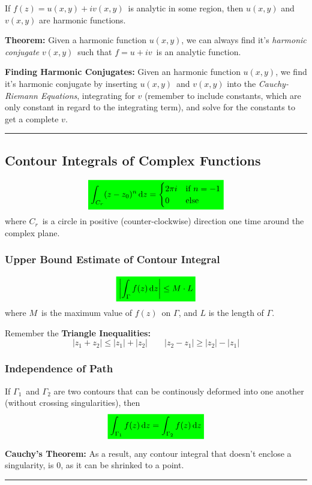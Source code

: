 \documentclass[10pt,a4paper]{article}
\newcommand{\holine}{\rule{286pt}{1pt}}
\newcommand{\gr}[1]{\colorbox{green}{$\displaystyle #1$}}
\begin{document}
\begin{multicols}{2}
If $f(z) = u(x,y) + iv(x,y)$ is analytic in some region, then $u(x,y)$ and $v(x,y)$ are harmonic functions.

\textbf{Theorem:} Given a harmonic function $u(x,y)$, we can always find it's \textit{harmonic conjugate} $v(x,y)$ such that $f = u + iv$ is an analytic function.


\textbf{Finding Harmonic Conjugates:} Given an harmonic function $u(x,y)$, we find it's harmonic conjugate by inserting $u(x,y)$ and $v(x,y)$ into the \textit{Cauchy-Riemann Equations}, integrating for $v$ (remember to include constants, which are only constant in regard to the integrating term), and solve for the constants to get a complete $v$.


\holine
\subsection*{Contour Integrals of Complex Functions}
\[\gr{
    \int_{C_r} (z-z_0)^n \dd{z} = \begin{cases}
    2\pi i &\text{if} \ n=-1 \\
    0 &\text{else}
    \end{cases}
}\]
where $C_r$ is a circle in positive (counter-clockwise) direction one time around the complex plane.

\subsubsection*{Upper Bound Estimate of Contour Integral}
\[\gr{
    \qty|\int_\Gamma f(z) \dd{z}| \leq M\cdot L
}\]
where $M$ is the maximum value of $f(z)$ on $\Gamma$, and $L$ is the length of $\Gamma$.

Remember the \textbf{Triangle Inequalities:}
\[
    |z_1 + z_2| \leq |z_1| + |z_2| \quad\quad |z_2 - z_1| \geq |z_2| - |z_1|
\]


\subsubsection*{Independence of Path}
If $\Gamma_1$ and $\Gamma_2$ are two contours that can be continously deformed into one another (without crossing singularities), then
\[\gr{
    \int_{\Gamma_1} f(z) \dd{z} = \int_{\Gamma_2} f(z) \dd{z}
}\]

\textbf{Cauchy's Theorem:} As a result, any contour integral that doesn't enclose a singularity, is 0, as it can be shrinked to a point.



\holine

\end{multicols}
\end{document}
